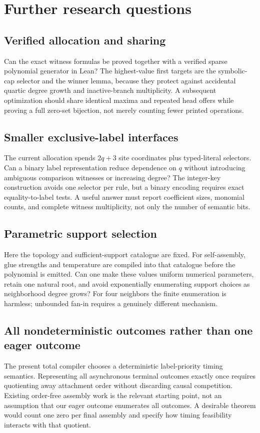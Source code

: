 \documentclass[11pt,letterpaper]{article}
\theoremstyle{definition}
\theoremstyle{remark}
\begin{document}
\section{Further research questions}\label{qoc:ts:sec:future}
\subsection{Verified allocation and sharing}
Can the exact witness formulas be proved together with a verified sparse
polynomial generator in Lean? The highest-value first targets are the
symbolic-cap selector and the winner lemma, because they protect against
accidental quartic degree growth and inactive-branch multiplicity. A
subsequent optimization should share identical maxima and repeated
head offers while proving a full zero-set bijection, not merely counting
fewer printed operations.

\subsection{Smaller exclusive-label interfaces}
The current allocation spends $2q+3$ site coordinates plus typed-literal
selectors. Can a binary label representation reduce dependence on $q$
without introducing ambiguous comparison witnesses or increasing degree?
The integer-key construction avoids one selector per rule, but a binary
encoding requires exact equality-to-label tests. A useful answer must
report coefficient sizes, monomial counts, and complete witness
multiplicity, not only the number of semantic bits.

\subsection{Parametric support selection}
Here the topology and sufficient-support catalogue are fixed. For
self-assembly, glue strengths and temperature are compiled into that
catalogue before the polynomial is emitted. Can one make these values
uniform numerical parameters, retain one natural root, and avoid
exponentially enumerating support choices as neighborhood degree grows?
For four neighbors the finite enumeration is harmless; unbounded fan-in
requires a genuinely different mechanism.

\subsection{All nondeterministic outcomes rather than one eager outcome}
The present total compiler chooses a deterministic label-priority timing
semantics. Representing all asynchronous terminal outcomes exactly once
requires quotienting away attachment order without discarding causal
competition. Existing order-free assembly work is the relevant starting
point, not an assumption that our eager outcome enumerates all outcomes.
A desirable theorem would count one zero per final assembly and specify
how timing feasibility interacts with that quotient.
\end{document}
